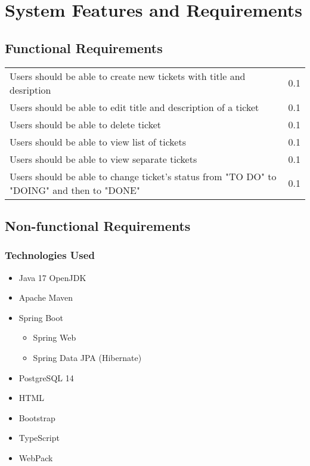 \documentclass[a4paper]{article}
\begin{document}
    \pagebreak
    \section{System Features and Requirements}

    \subsection{Functional Requirements}
    \begin{table}[htbp]
        \centering
        \begin{tabularx}{\linewidth}{|X|l|}
            \hline
            \centering{Description}                                                                   & \centering{Version} \tabularnewline \hline
            Users should be able to create new tickets with title and desription                      & 0.1                 \tabularnewline \hline
            Users should be able to edit title and description of a ticket                            & 0.1                 \tabularnewline \hline
            Users should be able to delete ticket                                                     & 0.1                 \tabularnewline \hline
            Users should be able to view list of tickets                                              & 0.1                 \tabularnewline \hline
            Users should be able to view separate tickets                                             & 0.1                 \tabularnewline \hline
            Users should be able to change ticket's status from "TO DO" to "DOING" and then to "DONE" & 0.1                 \tabularnewline \hline
        \end{tabularx}
    \end{table}

    \subsection{Non-functional Requirements}

    \subsubsection{Technologies Used}
    \begin{itemize}
        \item Java 17 OpenJDK
        \item Apache Maven
        \item Spring Boot
        \begin{itemize}
            \item Spring Web
            \item Spring Data JPA (Hibernate)
        \end{itemize}
        \item PostgreSQL 14
        \item HTML
        \item Bootstrap
        \item TypeScript
        \item WebPack
    \end{itemize}
\end{document}

